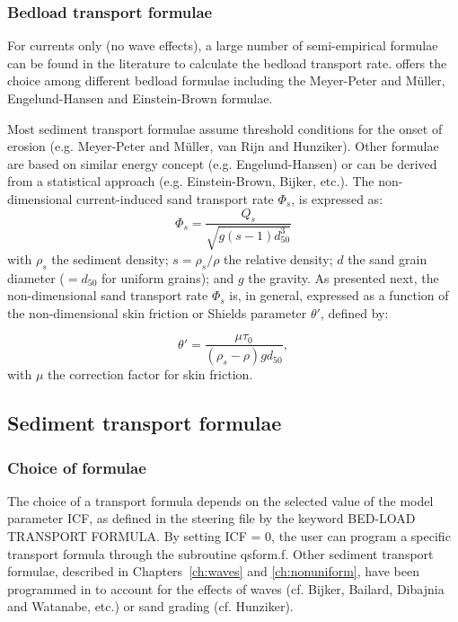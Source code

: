 \subsubsection{Bedload transport formulae}
For currents only (no wave effects), a large number of semi-empirical
formulae can be found in the literature to calculate the bedload transport
rate. \sisyphe offers the choice among different bedload formulae
including the Meyer-Peter and M\"{u}ller, Engelund-Hansen and Einstein-Brown formulae.

Most sediment transport formulae assume threshold conditions for the onset
of erosion (e.g. Meyer-Peter and M\"{u}ller, van Rijn and Hunziker). Other formulae are based on similar
energy concept (e.g. Engelund-Hansen) or can be derived from a statistical approach (e.g. Einstein-Brown,
Bijker, etc.). The non-dimensional current-induced sand transport rate $\Phi_s$, is expressed as:
\begin{equation}\label{eq:Phis}
\Phi_s = \frac{Q_s}{\sqrt{g(s-1)d_{50}^3}} 
\end{equation}
with $\rho_s$ the sediment density; $s=\rho_s/\rho$ the relative density; $d$ the sand grain diameter ($=d_{50}$ for uniform grains); and $g$ the gravity. As presented next, the non-dimensional sand transport rate $\Phi_s$ is, in general, expressed as a function of the non-dimensional
skin friction or Shields parameter $\theta'$, defined by:

\begin{equation}\label{eq:shieldsp}
\theta'=\frac{\mu\tau_0}{(\rho_s-\rho)gd_{50}},
\end{equation}
with $\mu$ the correction factor for skin friction.

\subsection{Sediment transport formulae}\label{sec:Sedimenttransportformulae}
\subsubsection{Choice of formulae}
The choice of a transport formula depends on the selected value of the model
parameter {\ttfamily ICF}, as defined in the steering file by the keyword {\ttfamily BED-LOAD TRANSPORT FORMULA}.
By setting {\ttfamily ICF = 0}, the user can program a specific transport formula through the subroutine {\ttfamily qsform.f}.
Other sediment transport formulae, described in Chapters~\ref{ch:waves} and \ref{ch:nonuniform}, have been
programmed in \sisyphe to account for the effects of waves (cf. Bijker,
Bailard, Dibajnia and Watanabe, etc.) or sand grading (cf. Hunziker). 

